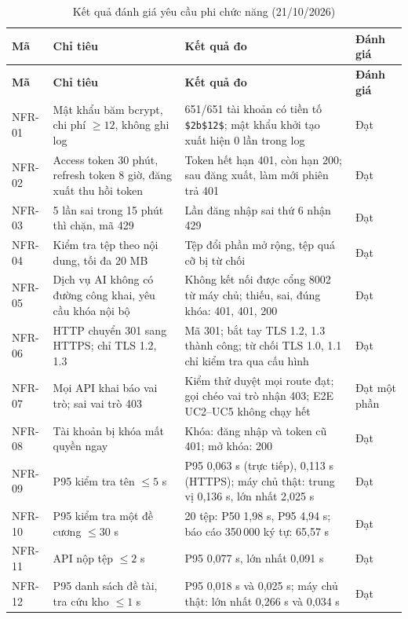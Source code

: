 \documentclass[../main.tex]{subfiles}
\begin{document}
{\renewcommand{\arraystretch}{1.15}
\begin{longtable}{|p{1.5cm}|p{4.4cm}|p{6.6cm}|p{1.7cm}|}
\caption{Kết quả đánh giá yêu cầu phi chức năng (21/10/2026)}\label{tab:c4-nfr}\\
\hline
\textbf{Mã} & \textbf{Chỉ tiêu} & \textbf{Kết quả đo} & \textbf{Đánh giá} \\
\hline
\endfirsthead
\hline
\textbf{Mã} & \textbf{Chỉ tiêu} & \textbf{Kết quả đo} & \textbf{Đánh giá} \\
\hline
\endhead
NFR-01 & Mật khẩu băm bcrypt, chi phí $\geq 12$, không ghi log & 651/651 tài khoản có tiền tố \texttt{\$2b\$12\$}; mật khẩu khởi tạo xuất hiện 0 lần trong log & Đạt \\
\hline
NFR-02 & Access token 30 phút, refresh token 8 giờ, đăng xuất thu hồi token & Token hết hạn 401, còn hạn 200; sau đăng xuất, làm mới phiên trả 401 & Đạt \\
\hline
NFR-03 & 5 lần sai trong 15 phút thì chặn, mã 429 & Lần đăng nhập sai thứ 6 nhận 429 & Đạt \\
\hline
NFR-04 & Kiểm tra tệp theo nội dung, tối đa 20 MB & Tệp đổi phần mở rộng, tệp quá cỡ bị từ chối & Đạt \\
\hline
NFR-05 & Dịch vụ AI không có đường công khai, yêu cầu khóa nội bộ & Không kết nối được cổng 8002 từ máy chủ; thiếu, sai, đúng khóa: 401, 401, 200 & Đạt \\
\hline
NFR-06 & HTTP chuyển 301 sang HTTPS; chỉ TLS 1.2, 1.3 & Mã 301; bắt tay TLS 1.2, 1.3 thành công; từ chối TLS 1.0, 1.1 chỉ kiểm tra qua cấu hình & Đạt \\
\hline
NFR-07 & Mọi API khai báo vai trò; sai vai trò 403 & Kiểm thử duyệt mọi route đạt; gọi chéo vai trò nhận 403; E2E UC2--UC5 không chạy hết & Đạt một phần \\
\hline
NFR-08 & Tài khoản bị khóa mất quyền ngay & Khóa: đăng nhập và token cũ 401; mở khóa: 200 & Đạt \\
\hline
NFR-09 & P95 kiểm tra tên $\leq 5$ s & P95 0,063 s (trực tiếp), 0,113 s (HTTPS); máy chủ thật: trung vị 0,136 s, lớn nhất 2,025 s & Đạt \\
\hline
NFR-10 & P95 kiểm tra một đề cương $\leq 30$ s & 20 tệp: P50 1,98 s, P95 4,94 s; báo cáo 350\,000 ký tự: 65,57 s & Đạt \\
\hline
NFR-11 & API nộp tệp $\leq 2$ s & P95 0,077 s, lớn nhất 0,091 s & Đạt \\
\hline
NFR-12 & P95 danh sách đề tài, tra cứu kho $\leq 1$ s & P95 0,018 s và 0,025 s; máy chủ thật: lớn nhất 0,266 s và 0,034 s & Đạt \\

\end{longtable}}
\end{document}
